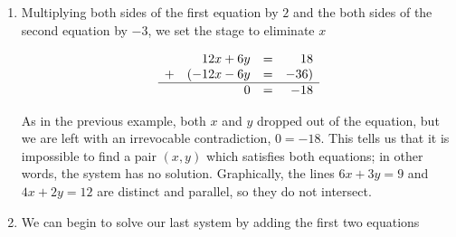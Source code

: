 \documentclass{ximera}
\begin{document}
\begin{example}
\begin{explanation}
\begin{enumerate}
For specific values of $t$, we can generate solutions.  For example, $t=0$ gives us the solution $\left(0,-\frac{3}{2}\right)$;  $t = 117$ gives us $(117,57)$, and while we can  check that each of these particular solutions satisfy both equations, the question is how do we check our general answer algebraically?  Same as always.  

We claim that for any real number $t$, the pair $\left(t, \frac{1}{2} t - \frac{3}{2}\right)$ satisfies both equations.  Substituting $x = t$ and $y =  \frac{1}{2} t - \frac{3}{2}$ into $2x - 4y = 6$ gives $2t - 4\left(\frac{1}{2} t - \frac{3}{2}\right) = 6$.  Simplifying, we get $2t - 2t + 6 = 6$, which is always true.  Similarly, when we make these substitutions in the equation $3x-6y = 9$, we get $3t - 6\left(\frac{1}{2} t - \frac{3}{2}\right) = 9$ which reduces to $3t - 3t + 9 = 9$, so it checks out, too.  

Geometrically, $2x-4y = 6$ and $3x-6y=9$ are the same line, which means that they intersect at every point on their graphs.  The reader is encouraged to think about how our parametric solution says exactly that.

\begin{center}
\end{center}

\item  Multiplying both sides of the first equation by $2$ and the both sides of the second equation by $-3$, we set the stage to eliminate $x$ 


\[ \begin{array}{lrcr} & 12x + 6y & = & 18  \\ + & (-12x-6y  & = & -36 ) \\ \hline  & 0 & = & -18 \end{array}\] 


As in the previous example, both $x$ and $y$ dropped out of the equation, but we are left with an irrevocable contradiction, $0 = -18$. This tells us that it is impossible to find a pair $(x,y)$ which satisfies both equations; in other words, the system has no solution.  Graphically, the lines  $6x + 3y =9$ and  $4x + 2y = 12$ are distinct and parallel, so they do not intersect.

\begin{center}
\end{center}

\item  We can begin to solve our last system by adding the first two equations  



\end{enumerate}
\end{explanation}
\end{example}
\end{document}
